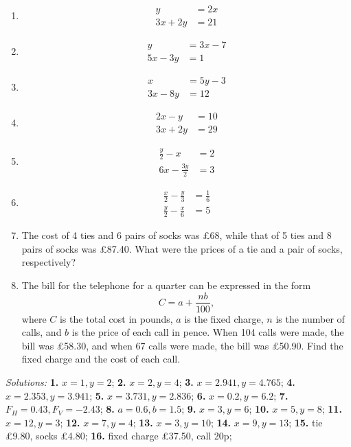 \documentclass[
  12pt,
  oneside]{book}
\theoremstyle{definition}
\theoremstyle{definition}
\theoremstyle{definition}
\theoremstyle{definition}
\theoremstyle{remark}
\begin{document}
\begin{enumerate}
\def\labelenumi{\arabic{enumi}.}
\setcounter{enumi}{8}
\item
  \begin{align*}
  y &= 2x\\
  3x+2y &= 21
  \end{align*}
\item
  \begin{align*}
     y &= 3x-7\\
     5x-3y &= 1
     \end{align*}
\item
  \begin{align*}
     x &= 5y-3\\
     3x-8y &= 12
     \end{align*}
\item
  \begin{align*}
     2x -y &= 10\\
     3x+2y &= 29
     \end{align*}
\item
  \begin{align*}
     \frac{y}{2}-x &= 2\\
     6x-\frac{3y}{2} &= 3
     \end{align*}
\item
  \begin{align*}
     \frac{x}{2}-\frac{y}{3} &= \frac{1}{6}\\
     \frac{y}{2}-\frac{x}{6} &= 5
     \end{align*}
\item
  The cost of 4 ties and 6 pairs of socks was £68, while that of 5 ties and 8 pairs of
  socks was £87.40. What were the prices of a tie and a pair of socks, respectively?
\item
  The bill for the telephone for a quarter can be expressed in the form
  \[C = a+ \frac{nb}{100},\]
  where \(C\) is the total cost in pounds, \(a\) is the fixed charge, \(n\) is the
  number of calls, and \(b\) is the price of each call in pence. When 104 calls
  were made, the bill was £58.30, and when 67 calls were made, the bill was £50.90.
  Find the fixed charge and the cost of each call.
\end{enumerate}

\emph{Solutions:} \textbf{1.} \(x=1,y=2\); \textbf{2.} \(x=2,y=4\); \textbf{3.} \(x=2.941, y=4.765\);
\textbf{4.} \(x=2.353,y=3.941\); \textbf{5.} \(x=3.731, y=2.836\); \textbf{6.} \(x=0.2,y=6.2\);
\textbf{7.} \(F_H=0.43, F_V=-2.43\); \textbf{8.} \(a=0.6,b=1.5\);
\textbf{9.} \(x=3, y=6\); \textbf{10.} \(x=5,y=8\); \textbf{11.} \(x=12, y=3\); \textbf{12.} \(x=7,y=4\);
\textbf{13.} \(x=3,y=10\); \textbf{14.} \(x=9,y=13\); \textbf{15.} tie £9.80, socks £4.80;
\textbf{16.} fixed charge £37.50, call 20p;
\end{document}
